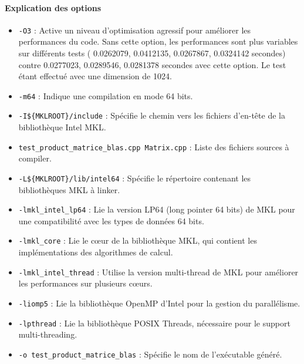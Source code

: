 \documentclass[a4paper,13pt]{book}
\begin{document}
\paragraph{Explication des options}
\begin{itemize}
    \item \texttt{-O3} : Active un niveau d'optimisation agressif pour améliorer les performances du code. Sans cette option, les performances sont plus variables sur différents tests ( 0.0262079, 0.0412135, 0.0267867, 0.0324142 secondes) contre 0.0277023, 0.0289546, 0.0281378 secondes avec cette option. Le test étant effectué avec une dimension de 1024.
    \item \texttt{-m64} : Indique une compilation en mode 64 bits.
    \item \texttt{-I\$\{MKLROOT\}/include} : Spécifie le chemin vers les fichiers d'en-tête de la bibliothèque Intel MKL.
    \item \texttt{test\_product\_matrice\_blas.cpp Matrix.cpp} : Liste des fichiers sources à compiler.
    \item \texttt{-L\$\{MKLROOT\}/lib/intel64} : Spécifie le répertoire contenant les bibliothèques MKL à linker.
    \item \texttt{-lmkl\_intel\_lp64} : Lie la version LP64 (long pointer 64 bits) de MKL pour une compatibilité avec les types de données 64 bits.
    \item \texttt{-lmkl\_core} : Lie le cœur de la bibliothèque MKL, qui contient les implémentations des algorithmes de calcul.
    \item \texttt{-lmkl\_intel\_thread} : Utilise la version multi-thread de MKL pour améliorer les performances sur plusieurs cœurs.
    \item \texttt{-liomp5} : Lie la bibliothèque OpenMP d'Intel pour la gestion du parallélisme.
    \item \texttt{-lpthread} : Lie la bibliothèque POSIX Threads, nécessaire pour le support multi-threading.
    \item \texttt{-o test\_product\_matrice\_blas} : Spécifie le nom de l'exécutable généré.
\end{itemize}
\end{document}
